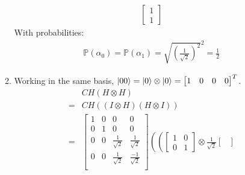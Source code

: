 \documentclass[11pt,a4paper]{article}
\begin{document}
\begin{enumerate}
\begin{enumerate}
\begin{align*}
\begin{bmatrix}
                                                                                                                         1 \\ 1
                                                                                                                     \end{bmatrix}
                    \end{align*}
                    With probabilities:
                    \begin{align*}
                        \mathbb{P}(\alpha_0) = \mathbb{P}(\alpha_1) = \sqrt{\left(\frac{1}{\sqrt{2}}\right)^2}^2 = \frac{1}{2}
                    \end{align*}
              \item Working in the same basis, $|00\rangle = |0\rangle \otimes |0\rangle = \begin{bmatrix}
                            1 & 0 & 0 & 0
                        \end{bmatrix}^T$.
                    \begin{align*}
                          & CH(H \otimes H)                                                                                                                                                      \\
                        = & CH((I \otimes H)(H \otimes I))                                                                                                                                       \\
                        = & \begin{bmatrix}
                                1 & 0 & 0                  & 0                   \\
                                0 & 1 & 0                  & 0                   \\
                                0 & 0 & \frac{1}{\sqrt{2}} & \frac{1}{\sqrt{2}}  \\
                                0 & 0 & \frac{1}{\sqrt{2}} & \frac{-1}{\sqrt{2}} \\
                            \end{bmatrix} \left( \left(\begin{bmatrix}
                                                               1 & 0 \\ 0 & 1
                                                           \end{bmatrix} \otimes \frac{1}{\sqrt{2}}\begin{bmatrix}

\end{bmatrix}
\end{align*}
\end{enumerate}
\end{enumerate}
\end{document}
